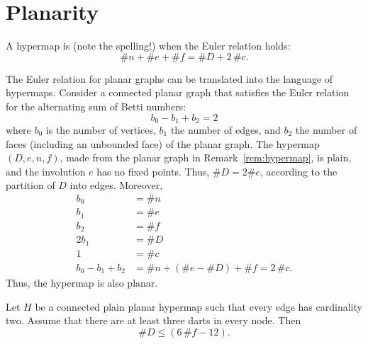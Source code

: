 \section{Planarity}
%
%

\begin{definition}[planar]  A hypermap is  (note the
spelling!) when the Euler relation holds:
\begin{displaymath}\# n + \# e + \# f = \# D + 2\, \#c.\end{displaymath}
%
\end{definition}


\begin{remark}\label{rem:Euler}   
The Euler relation for planar graphs can be translated into the
language of hypermaps.  Consider a connected planar graph that
satisfies the Euler relation for the alternating sum of Betti
numbers:
\begin{displaymath}b_0 - b_1 + b_2 = 2\end{displaymath} where $b_0$
is the number of vertices, $b_1$ the number of edges, and $b_2$ the
number of faces (including an unbounded face) of the planar
graph. The hypermap $(D,e,n,f)$, made from the planar graph in
Remark~\ref{rem:hypermap}, is plain, and the involution $e$ has no fixed points.  
Thus, $\# D = 2\#e$, according to the partition of $D$ into edges.  Moreover,
\begin{displaymath}\begin{array}{lll}
b_0 &= \# n\\
b_1 &= \# e\\
b_2 &= \# f\\
2b_1 &= \# D\\
1 &= \#c\\
b_0 - b_1 + b_2  &= \# n + (\#e - \#D) + \# f = 2\,\# c.
\end{array}
\end{displaymath}
Thus, the hypermap is also planar.
\end{remark}


\begin{lemma}\label{lemma:dart-upper} 
Let $H$ be a connected plain planar hypermap such that every edge
has cardinality two.  Assume that there are at least three darts in
every node.  Then
\begin{displaymath}
\# D \le (6\, \#f - 12).
\end{displaymath}
\end{lemma}
%

